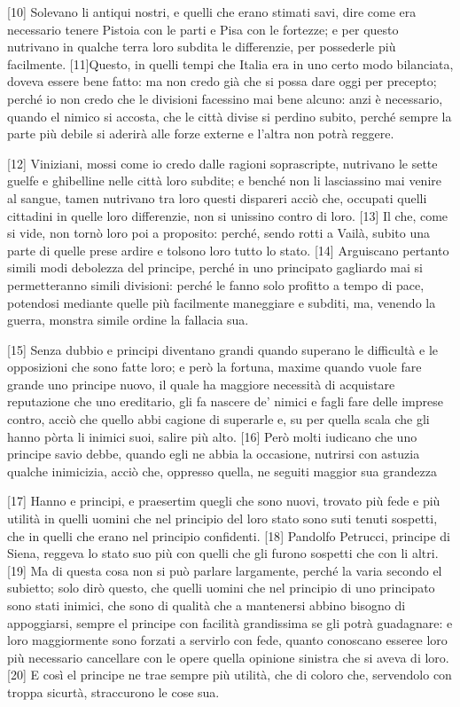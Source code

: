 {[}10{]} Solevano li antiqui nostri, e quelli che erano stimati savi,
dire come era necessario tenere Pistoia con le parti e Pisa con le
fortezze; e per questo nutrivano in qualche terra loro subdita le
differenzie, per possederle più facilmente. {[}11{]}Questo, in quelli
tempi che Italia era in uno certo modo bilanciata, doveva essere bene
fatto: ma non credo già che si possa dare oggi per precepto; perché io
non credo che le divisioni facessino mai bene alcuno: anzi è necessario,
quando el nimico si accosta, che le città divise si perdino subito,
perché sempre la parte più debile si aderirà alle forze externe e
l'altra non potrà reggere.

{[}12{]} Viniziani, mossi come io credo dalle ragioni soprascripte,
nutrivano le sette guelfe e ghibelline nelle città loro subdite; e
benché non li lasciassino mai venire al sangue, tamen nutrivano tra loro
questi dispareri acciò che, occupati quelli cittadini in quelle loro
differenzie, non si unissino contro di loro. {[}13{]} Il che, come si
vide, non tornò loro poi a proposito: perché, sendo rotti a Vailà,
subito una parte di quelle prese ardire e tolsono loro tutto lo stato.
{[}14{]} Arguiscano pertanto simili modi debolezza del principe, perché
in uno principato gagliardo mai si permetteranno simili divisioni:
perché le fanno solo profitto a tempo di pace, potendosi mediante quelle
più facilmente maneggiare e subditi, ma, venendo la guerra, monstra
simile ordine la fallacia sua.

{[}15{]} Senza dubbio e principi diventano grandi quando superano le
difficultà e le opposizioni che sono fatte loro; e però la fortuna,
maxime quando vuole fare grande uno principe nuovo, il quale ha maggiore
necessità di acquistare reputazione che uno ereditario, gli fa nascere
de' nimici e fagli fare delle imprese contro, acciò che quello abbi
cagione di superarle e, su per quella scala che gli hanno pòrta li
inimici suoi, salire più alto. {[}16{]} Però molti iudicano che uno
principe savio debbe, quando egli ne abbia la occasione, nutrirsi con
astuzia qualche inimicizia, acciò che, oppresso quella, ne seguiti
maggior sua grandezza

{[}17{]} Hanno e principi, e praesertim quegli che sono nuovi, trovato
più fede e più utilità in quelli uomini che nel principio del loro stato
sono suti tenuti sospetti, che in quelli che erano nel principio
confidenti. {[}18{]} Pandolfo Petrucci, principe di Siena, reggeva lo
stato suo più con quelli che gli furono sospetti che con li altri.
{[}19{]} Ma di questa cosa non si può parlare largamente, perché la
varia secondo el subietto; solo dirò questo, che quelli uomini che nel
principio di uno principato sono stati inimici, che sono di qualità che
a mantenersi abbino bisogno di appoggiarsi, sempre el principe con
facilità grandissima se gli potrà guadagnare: e loro maggiormente sono
forzati a servirlo con fede, quanto conoscano esseree loro più
necessario cancellare con le opere quella opinione sinistra che si aveva
di loro. {[}20{]} E così el principe ne trae sempre più utilità, che di
coloro che, servendolo con troppa sicurtà, straccurono le cose sua.

